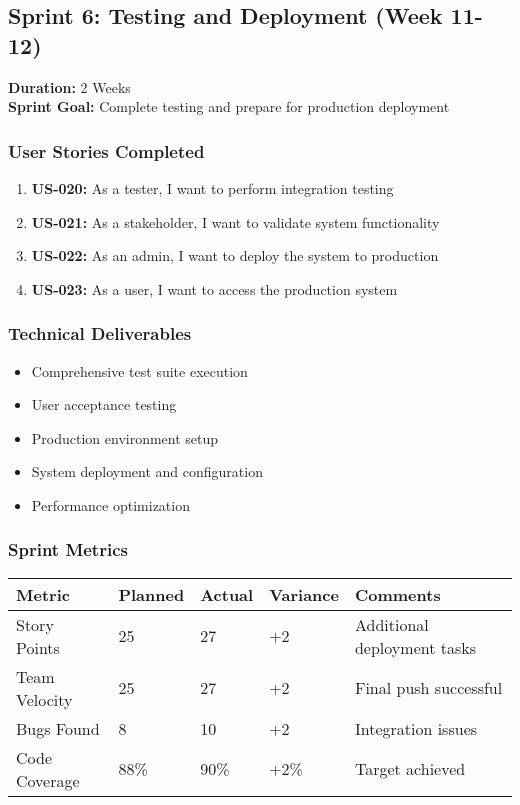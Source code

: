 \documentclass[12pt,a4paper]{article}
\begin{document}
\subsection{Sprint 6: Testing and Deployment (Week 11-12)}
\textbf{Duration:} 2 Weeks \\
\textbf{Sprint Goal:} Complete testing and prepare for production deployment

\subsubsection{User Stories Completed}
\begin{enumerate}
    \item \textbf{US-020:} As a tester, I want to perform integration testing
    \item \textbf{US-021:} As a stakeholder, I want to validate system functionality
    \item \textbf{US-022:} As an admin, I want to deploy the system to production
    \item \textbf{US-023:} As a user, I want to access the production system
\end{enumerate}

\subsubsection{Technical Deliverables}
\begin{itemize}
    \item Comprehensive test suite execution
    \item User acceptance testing
    \item Production environment setup
    \item System deployment and configuration
    \item Performance optimization
\end{itemize}

\subsubsection{Sprint Metrics}
\begin{longtable}{|p{4cm}|p{2cm}|p{2cm}|p{2cm}|p{4cm}|}
\hline
\textbf{Metric} & \textbf{Planned} & \textbf{Actual} & \textbf{Variance} & \textbf{Comments} \\
\hline
Story Points & 25 & 27 & +2 & Additional deployment tasks \\
\hline
Team Velocity & 25 & 27 & +2 & Final push successful \\
\hline
Bugs Found & 8 & 10 & +2 & Integration issues \\
\hline
Code Coverage & 88\% & 90\% & +2\% & Target achieved \\
\hline
\end{longtable}
\end{document}
